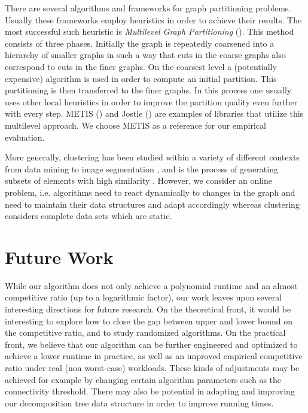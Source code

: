 \documentclass[a4paper,UKenglish,cleveref, autoref, thm-restate,authorcolumns]{lipics-v2019}
\begin{document}
There are several algorithms and frameworks for graph partitioning problems. Usually these frameworks employ heuristics in order to achieve their results. The most successful such heuristic is \textit{Multilevel Graph Partitioning} (\cite{Buluc2016}). This method consists of three phases. Initially the graph is repeatedly coarsened into a hierarchy of smaller graphs in such a way that cuts in the coarse graphs also correspond to cuts in the finer graphs. On the coarsest level a (potentially expensive) algorithm is used in order to compute an initial partition. This partitioning is then transferred to the finer graphs. In this process one usually uses other local heuristics in order to improve the partition quality even further with every step.
METIS (\cite{Karypis1998, Karypis1998a}) and Jostle (\cite{Walshaw2000, walshaw2007jostle}) are examples of libraries that utilize this multilevel approach. We choose METIS as a reference for our empirical evaluation.

More generally, clustering has been studied within a variety of
different contexts 
from data mining to image segmentation \cite{Benabdellah2019, Wu1993, Pavana},
and is the process of generating subsets of elements with high similarity 
\cite{Hartuv2000}. 
However, we consider an online problem, i.e. algorithms need to react dynamically to changes in the graph and need to maintain their data structures and adapt accordingly whereas clustering considers complete data sets which are static.

\section{Future Work}
	\label{sec:future_work}
	
While our algorithm does not only achieve a polynomial runtime
and an almost competitive ratio (up to a logarithmic factor),
our work leaves upon several interesting directions for future
research. 
On the theoretical front, it would be interesting to explore
how to close the gap between upper and lower bound
on the competitive ratio, and to study randomized algorithms.
On the practical front, we believe that our algorithm can
be further engineered and optimized to achieve a lower runtime
in practice, as well as an improved empirical competitive ratio
under real (non worst-case) workloads.
These kinds of adjustments may be achieved for example by changing certain algorithm parameters such as the connectivity threshold.
There may also be potential in adapting and improving our decomposition tree data structure in order to improve running times.
\end{document}
